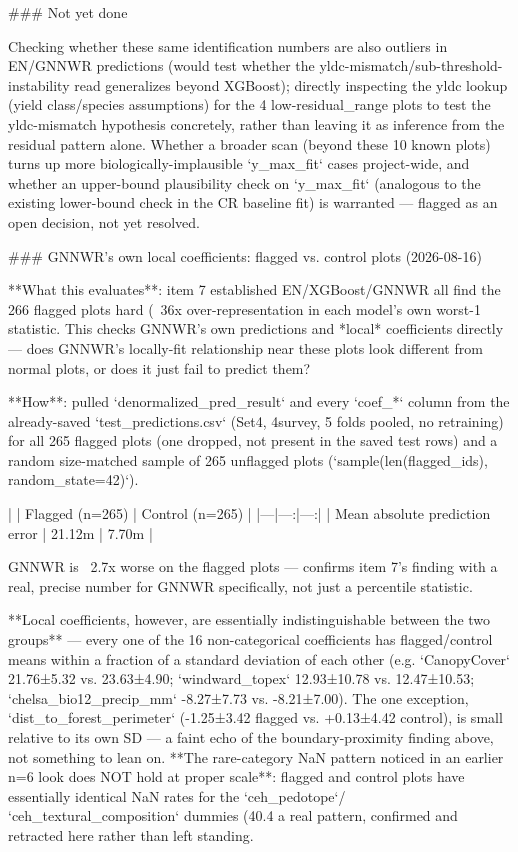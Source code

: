 ### Not yet done

Checking whether these same identification numbers are also outliers in EN/GNNWR predictions
(would test whether the yldc-mismatch/sub-threshold-instability read generalizes beyond XGBoost);
directly inspecting the yldc lookup (yield class/species assumptions) for the 4 low-residual_range
plots to test the yldc-mismatch hypothesis concretely, rather than leaving it as inference from the
residual pattern alone. Whether a broader scan (beyond these 10 known plots) turns up more
biologically-implausible `y_max_fit` cases project-wide, and whether an upper-bound plausibility
check on `y_max_fit` (analogous to the existing lower-bound check in the CR baseline fit) is
warranted — flagged as an open decision, not yet resolved.

### GNNWR's own local coefficients: flagged vs. control plots (2026-08-16)

**What this evaluates**: item 7 established EN/XGBoost/GNNWR all find the 266 flagged plots hard
(~36x over-representation in each model's own worst-1%
statistic. This checks GNNWR's own predictions and *local* coefficients directly — does GNNWR's
locally-fit relationship near these plots look different from normal plots, or does it just fail to
predict them?

**How**: pulled `denormalized_pred_result` and every `coef_*` column from the already-saved
`test_predictions.csv` (Set4, 4survey, 5 folds pooled, no retraining) for all 265 flagged plots
(one dropped, not present in the saved test rows) and a random size-matched sample of 265 unflagged
plots (`sample(len(flagged_ids), random_state=42)`).

| | Flagged (n=265) | Control (n=265) |
|---|---:|---:|
| Mean absolute prediction error | 21.12m | 7.70m |

GNNWR is ~2.7x worse on the flagged plots — confirms item 7's finding with a real, precise number
for GNNWR specifically, not just a percentile statistic.

**Local coefficients, however, are essentially indistinguishable between the two groups** — every
one of the 16 non-categorical coefficients has flagged/control means within a fraction of a
standard deviation of each other (e.g. `CanopyCover` 21.76±5.32 vs. 23.63±4.90; `windward_topex`
12.93±10.78 vs. 12.47±10.53; `chelsa_bio12_precip_mm` -8.27±7.73 vs. -8.21±7.00). The one exception,
`dist_to_forest_perimeter` (-1.25±3.42 flagged vs. +0.13±4.42 control), is small relative to its
own SD — a faint echo of the boundary-proximity finding above, not something to lean on.
**The rare-category NaN pattern noticed in an earlier n=6 look does NOT hold at proper scale**:
flagged and control plots have essentially identical NaN rates for the `ceh_pedotope`/
`ceh_textural_composition` dummies (40.4%
a real pattern, confirmed and retracted here rather than left standing.

